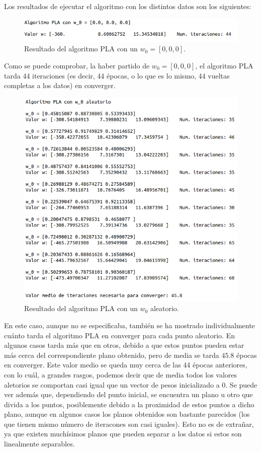 \documentclass[11pt,a4paper]{article}
\begin{document}
Los resultados de ejecutar el algoritmo con los distintos datos son los siguientes:

\begin{figure}[H]
\centering
\includegraphics[scale=0.6]{img/pla_0_normal.png}
\caption{Resultado del algoritmo PLA con un $w_0 = [0, 0, 0]$.}
\end{figure}

Como se puede comprobar, la haber partido de $w_0 = [0, 0, 0]$, el algoritmo PLA tarda 44 iteraciones
(es decir, 44 épocas, o lo que es lo mismo, 44 vueltas completas a los datos) en converger.

\begin{figure}[H]
\centering
\includegraphics[scale=0.52]{img/pla_rand_normal.png}
\caption{Resultado del algoritmo PLA con un $w_0$ aleatorio.}
\end{figure}

En este caso, aunque no se especificaba, también se ha mostrado individualmente cuánto tarda el
algoritmo PLA en converger para cada punto aleatorio. En algunos casos tarda más que en otros, debido
a que estos puntos pueden estar más cerca del correspondiente plano obtenido, pero de media se tarda
$45.8$ épocas en converger. Este valor medio se queda muy cerca de las 44 épocas anteriores, con
lo cuál, a grandes rasgos, podemos decir que de media todos los valores aletorios se comportan casi
igual que un vector de pesos inicializado a 0. Se puede ver además que, dependiendo del punto inicial,
se encuentra un plano u otro que divida a los puntos, posiblemente debido a la proximidad de estos
puntos a dicho plano, aunque en algunos casos los planos obtenidos son bastante parecidos (los que
tienen mismo número de iteracones son casi iguales). Esto no es
de extrañar, ya que existen muchísimos planos que pueden separar a los datos si estos son linealmente
separables.
\end{document}
